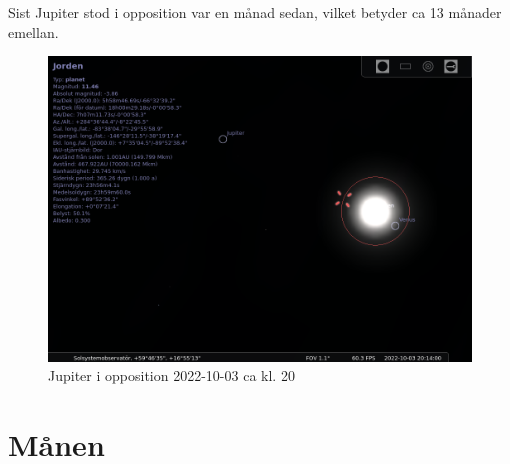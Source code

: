 \documentclass[./exercises.tex]{subfiles}
\begin{document}
\begin{itemize}
Sist Jupiter stod i opposition var en månad sedan, vilket betyder ca 13 månader emellan.
\begin{figure}[H]
\centering
  \includegraphics[scale=0.4]{stellarium-053.png}
  \caption{Jupiter i opposition 2022-10-03 ca kl. 20 }
  \label{fig4}
\end{figure}
\end{itemize}

\newpage
\section{Månen}
\end{document}
